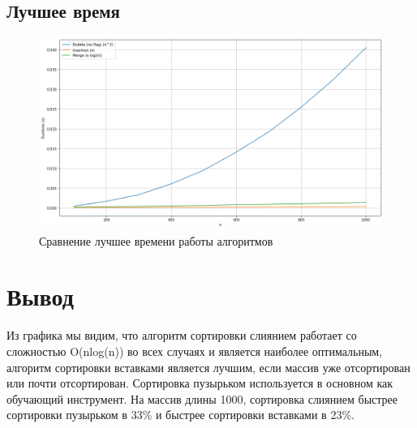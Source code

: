 \subsection{Лучшее время}
\begin{figure}[h!]
    \centering
    \includegraphics[width=1\textwidth]{3/inc/p5.png}
    \caption{Сравнение лучшее времени работы алгоритмов}
\end{figure}



\section{Вывод}

Из графика мы видим, что алгоритм сортировки слиянием работает со сложностью
O(nlog(n)) во всех случаях и является наиболее оптимальным,
алгоритм сортировки вставками является лучшим, если массив уже отсортирован или почти отсортирован.
Сортировка пузырьком используется в основном как обучающий инструмент.
На массив длины 1000, сортировка слиянием быстрее сортировки
пузырьком в 33\% и быстрее сортировки вставками в 23\%.
